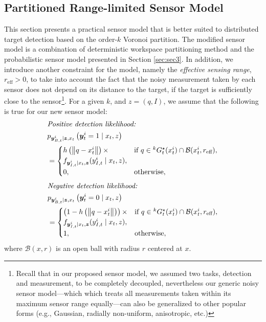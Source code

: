 \documentclass[letterpaper, 10 pt, conference]{ieeeconf}
\begin{document}
\subsection{Partitioned Range-limited Sensor Model}
This section presents a practical sensor model that is better suited to distributed target detection based on the order-$k$ Voronoi partition.
The modified sensor model is a combination of deterministic workspace partitioning method and the probabilistic sensor model presented in Section \ref{sec:sec3}. 
In addition, we introduce another constraint for the model, namely the \emph{effective sensing range}, $r_{\text{eff}} >0$, to take into account the fact that the noisy measurement taken by each sensor does not depend on its distance to the target, if the target is sufficiently close to the sensor\footnote{Recall that in our proposed sensor model, we assumed two tasks, detection and measurement, to be completely decoupled, nevertheless our generic noisy sensor model---which which treats all measurements taken within its maximum sensor range equally---can also be generalized to other popular forms (e.g., Gaussian, radially non-uniform, anisotropic, etc.)}. 
For a given $k$, and $z = (q,I)$, we assume that the following is true for our new sensor model:
\begin{align}
&\textit{Positive detection likelihood:} \nonumber \\
&p_{\bm{y}_{B,t}^i \mid \bm{z},x_t
}\left(\bm{y}_t^i = 1 \mid x_t,z
\right) \nonumber\\
&=\begin{cases}
h\left(\left\|q-x_t^i \right\|\right) \times & \textup{if }q \in {}^kG_t^{\star}(x_t^i)
\cap \mathcal{B}(x_t^i,r_{\text{eff}})
,\nonumber \\
f_{\bm{y}_{I,t}^i \mid x_t,\bm{z}}(y_{I,t}^i \mid x_t,z),  \\
0, & \textup{otherwise},
\end{cases}\nonumber 
\end{align}
\begin{align}
&\textit{Negative detection likelihood:} \nonumber\\
&p_{\bm{y}_{B,t}^i \mid \bm{z},x_t
}\left(\bm{y}_t^i = 0 \mid x_t,z
\right)\nonumber  \\
&=\begin{cases}
\left(1-h\left(\left\|q-x_t^i \right\|\right)\right) \times & \textup{if }q \in {}^kG_t^{\star}(x_t^i) \cap \mathcal{B}(x_t^i,r_{\text{eff}}), \\
f_{\bm{y}_{I,t}^i \mid x_t,\bm{z}}(y_{I,t}^i \mid x_t,z), \\
1,  & \textup{otherwise},
\end{cases}
\label{sensorf}
\end{align}
where $\mathcal{B}(x,r)$ is an open ball with radius $r$ centered at $x$.
\end{document}
